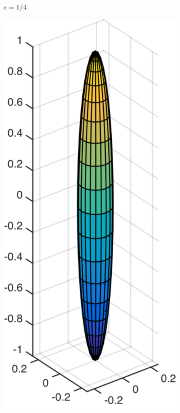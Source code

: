 \documentclass[a4paper,11pt]{kth-mag}
\begin{document}
\begin{figure}[!htbp]
\begin{subfigure}[h]{0.24\textwidth}
    \caption{$\epsilon=1/4$}\label{fig:slenderness_1_4}
  \end{subfigure}
  \begin{subfigure}[h]{0.24\textwidth}
    \centering
    \includegraphics[width=\textwidth]{img/slender/1_10.png}

\end{subfigure}
\end{figure}
\end{document}
